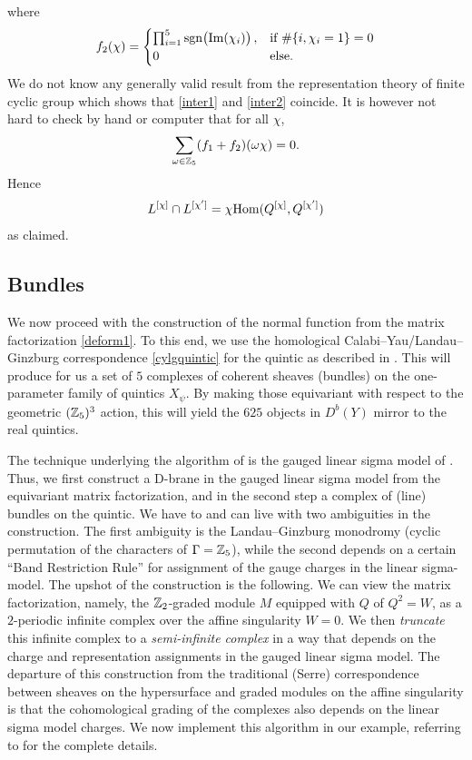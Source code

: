 where
\begin{equation}
f_2(\chi) = \begin{cases}
\prod_{i=1}^5 {\rm sgn}\bigr(\Im(\chi_i)\bigr)\,, & \text{if $\#\{i,\chi_i=1\} = 0$} \\
0 & \text{else} .
\end{cases}
\end{equation}
We do not know any generally valid result from the representation theory
of finite cyclic group which shows that \eqref{inter1} and \eqref{inter2}
coincide. It is however not hard to check by hand or computer that for
all $\chi$,
\begin{equation}
\sum_{\om\in\zet_5} (f_1+f_2)(\om\chi) = 0 .
\end{equation}
Hence
\begin{equation}
L^{[\chi]}\cap L^{[\chi']} = \chi\Hom(Q^{[\chi]},Q^{[\chi']})
\end{equation}
as claimed. 


\subsection{Bundles}

We now proceed with the construction of the normal function from the matrix
factorization \eqref{deform1}. To this end, we use the homological Calabi--Yau/Landau--Ginzburg
correspondence \eqref{cylgquintic} for the quintic as described in \cite{hhp}. 
This will produce for us a set of $5$ complexes of coherent 
sheaves (bundles) on the one-parameter family of quintics $X_\psi$. By making those 
equivariant with respect to the geometric $(\zet_5)^3$ action, this will yield the 
$625$ objects in $D^b(Y)$ mirror to the real quintics. 

The technique underlying the algorithm of \cite{hhp} is the gauged linear sigma
model of \cite{Witten:1993yc}. Thus, we first construct a D-brane in the gauged
linear sigma model from the equivariant matrix factorization, and in the second
step a complex of (line) bundles on the quintic. We have to and can live with
two ambiguities in the construction. The first  ambiguity is the Landau--Ginzburg 
monodromy (cyclic permutation of the characters of $\Gamma=\zet_5$), while the second 
depends on a certain ``Band Restriction Rule'' for assignment of the gauge charges in
the linear sigma-model. The upshot of the construction is the following. We can view
the matrix factorization, namely, the $\zet_2$-graded module $M$ equipped with
$Q$ of $Q^2=W$, as a $2$-periodic infinite complex over the affine singularity
$W=0$. We then {\it truncate} this infinite complex to a {\it semi-infinite complex}
in a way that depends on the charge and representation assignments in the gauged
linear sigma model. The departure of this construction from the traditional (Serre)
correspondence between sheaves on the hypersurface and graded modules on the affine
singularity is that the cohomological grading of the complexes also depends on the
linear sigma model charges. We now implement this algorithm in our example, 
referring to \cite{hhp} for the complete details.

